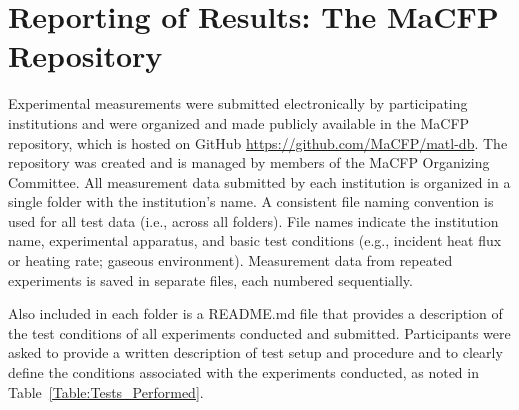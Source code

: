\documentclass{book}
\begin{document}
\section{Reporting of Results: The MaCFP Repository}

Experimental measurements were submitted electronically by participating institutions and were organized and made publicly available in the MaCFP repository, which is hosted on GitHub \href{https://github.com/MaCFP/matl-db}{https://github.com/MaCFP/matl-db}. The repository was created and is managed by members of the MaCFP Organizing Committee. All measurement data submitted by each institution is organized in a single folder with the institution’s name. A consistent file naming convention is used for all test data (i.e., across all folders). File names indicate the institution name, experimental apparatus, and basic test conditions (e.g., incident heat flux or heating rate; gaseous environment). Measurement data from repeated experiments is saved in separate files, each numbered sequentially.

Also included in each folder is a README.md file that provides a description of the test conditions of all experiments conducted and submitted. Participants were asked to provide a written description of test setup and procedure and to clearly define the conditions associated with the experiments conducted, as noted in Table~\ref{Table:Tests_Performed}.
\end{document}
